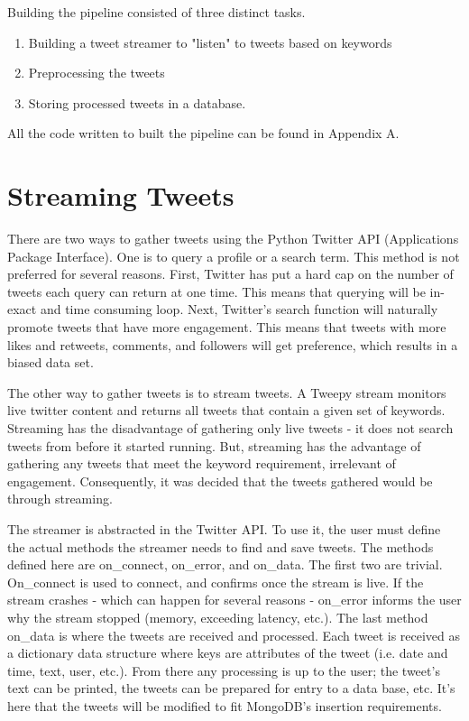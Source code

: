 \documentclass[11pt, twoside, reqno]{book}
\begin{document}
Building the pipeline consisted of three distinct tasks. 
\begin{enumerate}
	\item Building a tweet streamer to "listen" to tweets based on keywords
	\item Preprocessing the tweets
	\item Storing processed tweets in a database. 
\end{enumerate}
All the code written to built the pipeline can be found in Appendix A.


\section{Streaming Tweets}
\hspace{0.2in} There are two ways to gather tweets using the Python Twitter API (Applications Package Interface). One is to query a profile or a search term. This method is not preferred for several reasons. First, Twitter has put a hard cap on the number of tweets each query can return at one time. This means that querying will be in-exact and time consuming loop. Next, Twitter's search function will naturally promote tweets that have more engagement. This means that tweets with more likes and retweets, comments, and followers will get preference, which results in a biased data set. 

The other way to gather tweets is to stream tweets. A Tweepy stream monitors live twitter content and returns all tweets that contain a given set of keywords. Streaming has the disadvantage of gathering only live tweets - it does not search tweets from before it started running. But, streaming has the advantage of gathering any tweets that meet the keyword requirement, irrelevant of engagement. Consequently, it was decided that the tweets gathered would be through streaming. 

The streamer is abstracted in the Twitter API. To use it, the user must define the actual methods the streamer needs to find and save tweets. The methods defined here are on\_connect, on\_error, and on\_data. The first two are trivial. On\_connect is used to connect, and confirms once the stream is live. If the stream crashes - which can happen for several reasons - on\_error informs the user why the stream stopped (memory, exceeding latency, etc.). The last method on\_data is where the tweets are received and processed. Each tweet is received as a dictionary data structure where keys are attributes of the tweet (i.e. date and time, text, user, etc.). From there any processing is up to the user; the tweet's text can be printed, the tweets can be prepared for entry to a data base, etc. It's here that the tweets will be modified to fit MongoDB's insertion requirements. 
\end{document}
